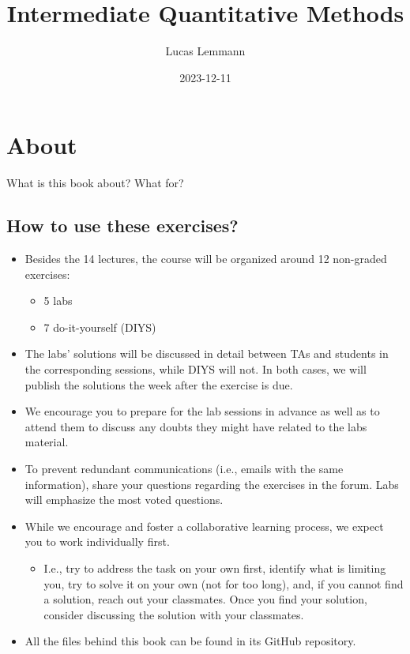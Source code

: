\documentclass[
]{book}
\title{Intermediate Quantitative Methods}
\author{Lucas Lemmann}
\date{2023-12-11}
\providecommand{\tightlist}{%
  \setlength{\itemsep}{0pt}\setlength{\parskip}{0pt}}
\begin{document}
\maketitle

{
\setcounter{tocdepth}{1}
\tableofcontents
}
\hypertarget{about}{%
\chapter*{About}\label{about}}

What is this book about? What for?

\hypertarget{how-to-use-these-exercises}{%
\section{How to use these exercises?}\label{how-to-use-these-exercises}}

\begin{itemize}
\tightlist
\item
  Besides the 14 lectures, the course will be organized around 12 non-graded exercises:

  \begin{itemize}
  \tightlist
  \item
    5 labs
  \item
    7 do-it-yourself (DIYS)
  \end{itemize}
\item
  The labs' solutions will be discussed in detail between TAs and students in the corresponding sessions, while DIYS will not. In both cases, we will publish the solutions the week after the exercise is due.
\item
  We encourage you to prepare for the lab sessions in advance as well as to attend them to discuss any doubts they might have related to the labs material.
\item
  To prevent redundant communications (i.e., emails with the same information), share your questions regarding the exercises in the forum. Labs will emphasize the most voted questions.
\item
  While we encourage and foster a collaborative learning process, we expect you to work individually first.

  \begin{itemize}
  \tightlist
  \item
    I.e., try to address the task on your own first, identify what is limiting you, try to solve it on your own (not for too long), and, if you cannot find a solution, reach out your classmates. Once you find your solution, consider discussing the solution with your classmates.
  \end{itemize}
\item
  All the files behind this book can be found in its GitHub repository.
\end{itemize}
\end{document}
